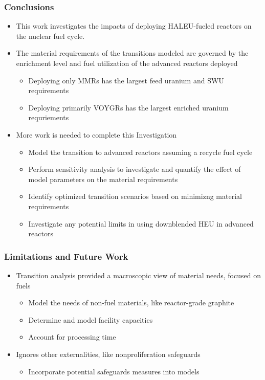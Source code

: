 \begin{frame}
      \frametitle{Conclusions}
      \begin{itemize}
        \item This work investigates the impacts of deploying \gls{HALEU}-fueled 
              reactors on the nuclear fuel cycle.
        \item The material requirements of the transitions modeled are governed 
              by the enrichment level and fuel utilization of the advanced 
              reactors deployed
            \begin{itemize}
              \item Deploying only \glspl{MMR} has the largest feed uranium and
                    \gls{SWU} requirements
              \item Deploying primarily VOYGRs has the largest enriched uranium 
                    requriements
            \end{itemize}
        \item More work is needed to complete this Investigation
        \begin{itemize}
            \item Model the transition to advanced reactors assuming a recycle fuel cycle
            \item Perform sensitivity analysis to investigate and quantify the effect 
                  of model parameters on the material requirements
            \item Identify optimized transition scenarios based on minimizng material 
                  requirements
            \item Investigate any potential limits in using downblended \gls{HEU} 
                  in advanced reactors
        \end{itemize}
      \end{itemize}
\end{frame}

\begin{frame}
      \frametitle{Limitations and Future Work}
      \begin{itemize}
            \item Transition analysis provided a macroscopic view of 
                  material needs, focused on fuels
            \begin{itemize}
                  \item<2-> Model the needs of non-fuel materials, 
                        like reactor-grade graphite
                  \item<2-> Determine and model facility capacities
                  \item<2-> Account for processing time 
            \end{itemize}
            \item<3-> Ignores other externalities, like nonproliferation
                    safeguards
            \begin{itemize}
                  \item<4-> Incorporate potential safeguards measures into models
            \end{itemize}
      \end{itemize} 
\end{frame}